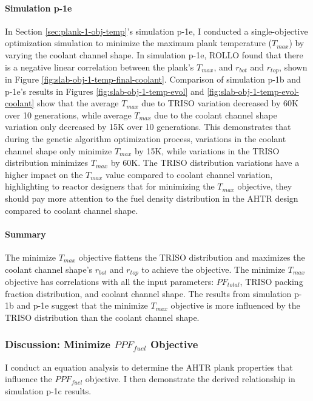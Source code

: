 \paragraph{Simulation p-1e}
In Section \ref{sec:plank-1-obj-temp}'s simulation p-1e, I conducted a single-objective 
optimization simulation to minimize the maximum plank temperature ($T_{max}$) by varying 
the coolant channel shape. 
In simulation p-1e, \gls{ROLLO} found that there is a negative linear correlation 
between the plank's $T_{max}$, and $r_{bot}$ and $r_{top}$, shown in 
Figure \ref{fig:slab-obj-1-temp-final-coolant}. 
Comparison of simulation p-1b and p-1e's results in 
Figures \ref{fig:slab-obj-1-temp-evol} and \ref{fig:slab-obj-1-temp-evol-coolant} show 
that the average $T_{max}$ due to \gls{TRISO} variation decreased by 60K over 
10 generations, while average $T_{max}$ due to the coolant channel shape variation 
only decreased by 15K over 10 generations. 
This demonstrates that during the genetic algorithm optimization process, 
variations in the coolant channel shape only minimize $T_{max}$ by 15K, while
variations in the TRISO distribution minimizes $T_{max}$ by 60K. 
The TRISO distribution variations have a higher impact on the $T_{max}$ value compared 
to coolant channel variation, highlighting to reactor designers that for minimizing 
the $T_{max}$ objective, they should pay more attention to the fuel density 
distribution in the \gls{AHTR} design compared to coolant channel shape.  

\paragraph{Summary}
The minimize $T_{max}$ objective flattens the TRISO distribution and maximizes the 
coolant channel shape's $r_{bot}$ and $r_{top}$ to achieve the objective. 
The minimize $T_{max}$ objective has correlations with all the input parameters: 
$PF_{total}$, TRISO packing fraction distribution, and coolant channel shape. 
The results from simulation p-1b and p-1e suggest that the minimize $T_{max}$ objective 
is more influenced by the TRISO distribution than the coolant channel shape. 

\subsubsection{Discussion: Minimize $PPF_{fuel}$ Objective}
I conduct an equation analysis to determine the \gls{AHTR} plank properties 
that influence the $PPF_{fuel}$ objective. 
I then demonstrate the derived relationship in simulation p-1c results.

